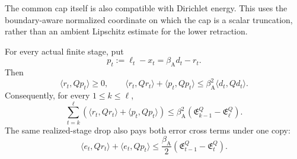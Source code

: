 The common cap itself is also compatible with Dirichlet energy.  This uses
the boundary-aware normalized coordinate on which the cap is a scalar
truncation, rather than an ambient Lipschitz estimate for the lower
retraction.

\begin{lemma}
\label{lem:aesp-cd-truncation-q-energy}
For every actual finite stage, put
\begin{equation*}
 p_t:=\ell_t-x_t=\beta_{\mathrm A}d_t-r_t.
\end{equation*}
Then
\begin{equation}
 \langle r_t,Qp_t\rangle\geq0,
 \qquad
 \langle r_t,Qr_t\rangle+\langle p_t,Qp_t\rangle
 \leq\beta_{\mathrm A}^2\langle d_t,Qd_t\rangle.
 \label{eq:aesp-cd-truncation-q-energy}
\end{equation}
Consequently, for every $1\leq k\leq\ell$,
\begin{equation}
 \sum_{t=k}^{\ell}
 \left(\langle r_t,Qr_t\rangle+\langle p_t,Qp_t\rangle\right)
 \leq\beta_{\mathrm A}^2
       (\mathfrak E_{k-1}^Q-\mathfrak E_\ell^Q).
 \label{eq:aesp-cd-truncation-q-window}
\end{equation}
The same realized-stage drop also pays both error cross terms under one copy:
\begin{equation}
 \langle e_t,Qr_t\rangle+\langle e_t,Qp_t\rangle
 \leq\frac{\beta_{\mathrm A}}2
       (\mathfrak E_{t-1}^Q-\mathfrak E_t^Q).
 \label{eq:aesp-cd-truncation-q-cross-drop}
\end{equation}
\end{lemma}

